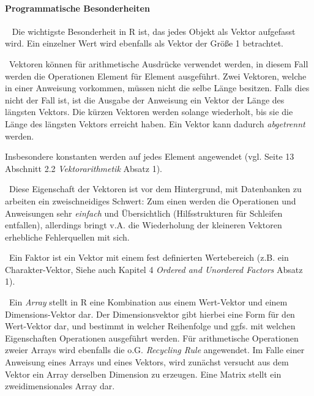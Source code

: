 \paragraph{Programmatische Besonderheiten}~\newline
Die wichtigste Besonderheit in R ist, das jedes Objekt als Vektor aufgefasst wird. Ein einzelner Wert wird ebenfalls als Vektor der Größe 1 betrachtet.

~\newline Vektoren können für arithmetische Ausdrücke verwendet werden, in diesem Fall werden die Operationen Element für Element ausgeführt. Zwei Vektoren, welche in einer Anweisung vorkommen, müssen nicht die selbe Länge besitzen. Falls dies nicht der Fall ist, ist die Ausgabe der Anweisung ein Vektor der Länge des längsten Vektors. Die kürzen Vektoren werden solange wiederholt, bis sie die Länge des längsten Vektors erreicht haben. Ein Vektor kann dadurch \textit{abgetrennt} werden.

Insbesondere konstanten werden auf jedes Element angewendet (vgl. \cite{RIntro} Seite 13 Abschnitt 2.2 \textit{Vektorarithmetik} Absatz 1).

~\newline Diese Eigenschaft der Vektoren ist vor dem Hintergrund, mit Datenbanken zu arbeiten ein zweischneidiges Schwert: Zum einen werden die Operationen und Anweisungen sehr \textit{einfach} und Übersichtlich (Hilfsstrukturen für Schleifen entfallen), allerdings bringt v.A. die Wiederholung der kleineren Vektoren erhebliche Fehlerquellen mit sich. 

~\newline Ein Faktor ist ein Vektor mit einem fest definierten Wertebereich (z.B. ein Charakter-Vektor, Siehe auch \cite{RIntro} Kapitel 4 \textit{Ordered and Unordered Factors} Absatz 1).

~\newline Ein \textit{Array} stellt in R eine Kombination aus einem Wert-Vektor und einem Dimensions-Vektor dar. Der Dimensionsvektor gibt hierbei eine Form für den Wert-Vektor dar, und bestimmt in welcher Reihenfolge und ggfs. mit welchen Eigenschaften Operationen ausgeführt werden. Für arithmetische Operationen zweier Arrays wird ebenfalls die o.G. \textit{Recycling Rule} angewendet. Im Falle einer Anweisung eines Arrays und eines Vektors, wird zunächst versucht aus dem Vektor ein Array derselben Dimension zu erzeugen. Eine Matrix stellt ein zweidimensionales Array dar. 

